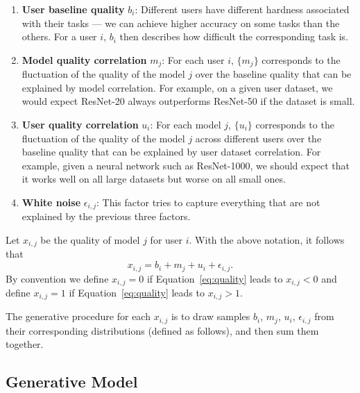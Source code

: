 \documentclass[letterpaper]{vldb}
\begin{document}
\vspace{-0.5em}
\begin{enumerate}
\item {\bf User baseline quality} $b_i$: Different users have different
      hardness associated with their tasks --- we can achieve higher accuracy on some tasks than the others.
      For a user $i$, $b_i$ then describes how difficult the corresponding task is.
\vspace{-0.5em}
\item {\bf Model quality correlation} $m_j$: For each user $i$, $\{m_j\}$ corresponds to the fluctuation of the quality of the model $j$ over the baseline quality that can be explained by model correlation.
      For example, on a given user dataset, we would expect ResNet-20 always outperforms ResNet-50 if the dataset is small.
\vspace{-0.5em}
\item {\bf User quality correlation} $u_i$: For each model $j$, $\{u_i\}$ corresponds to the fluctuation of the quality of the model $j$ across different users
      over the baseline quality that can be explained by user dataset correlation.
      For example, given a neural network such as ResNet-1000, we should expect that it works well on all large datasets but worse on all small ones.
\vspace{-0.5em}
\item {\bf White noise} $\epsilon_{i,j}$: This factor tries to capture everything that are
      not explained by the previous three factors.
\end{enumerate}
\vspace{-0.5em}

Let $x_{i,j}$ be the quality of model $j$ for user $i$. With the above notation, it follows that
\begin{equation}\label{eq:quality}
x_{i,j} = b_i + m_j + u_i + \epsilon_{i,j}.
\end{equation}
By convention we define $x_{i,j}=0$ if Equation~\ref{eq:quality} leads to $x_{i,j}<0$ and define $x_{i,j}=1$ if Equation~\ref{eq:quality} leads to $x_{i,j}>1$.

The generative procedure for each $x_{i,j}$ is to draw samples 
$b_i$, $m_j$, $u_i$, $\epsilon_{i,j}$ from their corresponding 
distributions (defined as follows), and then sum them together.

\subsection{Generative Model}
\end{document}
